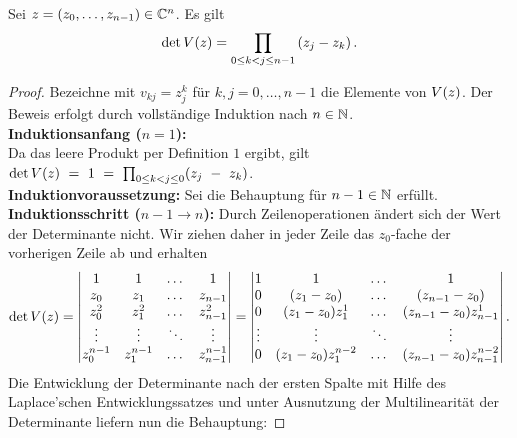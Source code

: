 \begin{lemma}
    Sei $z = (z_0, \dots, z_{n-1}) \in \mathbb{C}^n$.
    Es gilt
    \[
        \det V \! \left( z \right)
        = \prod_{0 \leq k < j \leq n-1} \left( z_j - z_k \right).
    \]
\end{lemma}

\begin{proof}
    Bezeichne mit $v_{kj} = z_j^k$ für $k,j = 0, \dots, n-1$ die Elemente von $V \! \left( z \right)$.
    Der Beweis erfolgt durch vollständige Induktion nach $n \in \mathbb{N}$.\\
    \textbf{Induktionsanfang (\boldmath $n=1$):}\\
    Da das leere Produkt per Definition $1$ ergibt, gilt
    $\det{V \! \left( z \right)}~=~1~=~\prod_{0 \leq k < j \leq 0} (z_j~-~z_k)$. \\[0.5em]
    \textbf{Induktionvoraussetzung:}
    Sei die Behauptung für $n-1 \in \mathbb{N}$ erfüllt.\\[0.5em]
    \textbf{Induktionsschritt (\boldmath $n\!-\!1 \rightarrow n$):}
    Durch Zeilenoperationen ändert sich der Wert der Determinante nicht.
    Wir ziehen daher in jeder Zeile das $z_0$-fache der vorherigen Zeile ab und
    erhalten
    \[
        \det{V \! \left( z \right)}
        = \begin{vmatrix}
            1         & 1         & \dots & 1 \\
            z_0       & z_1       & \dots & z_{n-1} \\
            z_0^2     & z_1^2     & \dots & z_{n-1}^2 \\
            \vdots    & \vdots    & \ddots & \vdots \\
            z_0^{n-1} & z_1^{n-1} & \dots & z_{n-1}^{n-1}
        \end{vmatrix}
        = \begin{vmatrix}
            1      & 1                  & \dots & 1 \\
            0      & (z_1-z_0)          & \dots & (z_{n-1}-z_0) \\
            0      & (z_1-z_0)z_1^1     & \dots & (z_{n-1}-z_0) z_{n-1}^1 \\
            \vdots & \vdots             & \ddots & \vdots \\
            0      & (z_1-z_0)z_1^{n-2} & \dots & (z_{n-1}-z_0) z_{n-1}^{n-2}
        \end{vmatrix}.
    \]
    Die Entwicklung der Determinante nach der ersten Spalte mit Hilfe des
    Laplace'schen Entwicklungssatzes und unter Ausnutzung der Multilinearität
    der Determinante liefern nun die Behauptung:

\end{proof}
